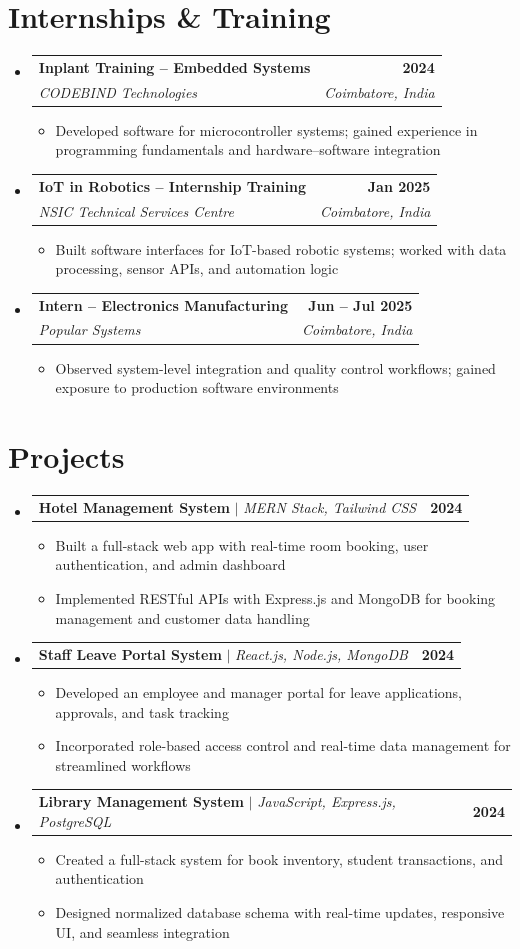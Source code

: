 \documentclass[letterpaper,11pt]{article}
\makeatletter
\newcommand{\resumeItem}[1]{
  \item\small{{#1 \vspace{-2pt}}}
}
\newcommand{\resumeSubheading}[4]{
  \vspace{-2pt}\item
  \begin{tabular*}{1.0\textwidth}[t]{l@{\extracolsep{\fill}}r}
    \textbf{#1} & \textbf{\small #2} \\
    \textit{\small#3} & \textit{\small #4} \\
  \end{tabular*}\vspace{-7pt}
}
\newcommand{\resumeProjectHeading}[2]{
  \item
  \begin{tabular*}{1.001\textwidth}{l@{\extracolsep{\fill}}r}
    \small#1 & \textbf{\small #2}\\
  \end{tabular*}\vspace{-7pt}
}
\newcommand{\resumeSubHeadingListStart}{\begin{itemize}[leftmargin=0.0in, label={}]}
\newcommand{\resumeSubHeadingListEnd}{\end{itemize}}
\newcommand{\resumeItemListStart}{\begin{itemize}}
\newcommand{\resumeItemListEnd}{\end{itemize}\vspace{-5pt}}
\makeatother
\begin{document}
\section{Internships \& Training}
\resumeSubHeadingListStart
  \resumeSubheading
    {Inplant Training -- Embedded Systems}{2024}
    {CODEBIND Technologies}{Coimbatore, India}
    \resumeItemListStart
      \resumeItem{Developed software for microcontroller systems; gained experience in programming fundamentals and hardware--software integration}
    \resumeItemListEnd

  \resumeSubheading
    {IoT in Robotics -- Internship Training}{Jan 2025}
    {NSIC Technical Services Centre}{Coimbatore, India}
    \resumeItemListStart
      \resumeItem{Built software interfaces for IoT-based robotic systems; worked with data processing, sensor APIs, and automation logic}
    \resumeItemListEnd

  \resumeSubheading
    {Intern -- Electronics Manufacturing}{Jun -- Jul 2025}
    {Popular Systems}{Coimbatore, India}
    \resumeItemListStart
      \resumeItem{Observed system-level integration and quality control workflows; gained exposure to production software environments}
    \resumeItemListEnd
\resumeSubHeadingListEnd

\section{Projects}
\resumeSubHeadingListStart
  \resumeProjectHeading
    {\textbf{Hotel Management System} $|$ \emph{MERN Stack, Tailwind CSS}}{2024}
    \resumeItemListStart
      \resumeItem{Built a full-stack web app with real-time room booking, user authentication, and admin dashboard}
      \resumeItem{Implemented RESTful APIs with Express.js and MongoDB for booking management and customer data handling}
    \resumeItemListEnd

  \resumeProjectHeading
    {\textbf{Staff Leave Portal System} $|$ \emph{React.js, Node.js, MongoDB}}{2024}
    \resumeItemListStart
      \resumeItem{Developed an employee and manager portal for leave applications, approvals, and task tracking}
      \resumeItem{Incorporated role-based access control and real-time data management for streamlined workflows}
    \resumeItemListEnd

  \resumeProjectHeading
    {\textbf{Library Management System} $|$ \emph{JavaScript, Express.js, PostgreSQL}}{2024}
    \resumeItemListStart
      \resumeItem{Created a full-stack system for book inventory, student transactions, and authentication}
      \resumeItem{Designed normalized database schema with real-time updates, responsive UI, and seamless integration}
    \resumeItemListEnd
\resumeSubHeadingListEnd
\end{document}
